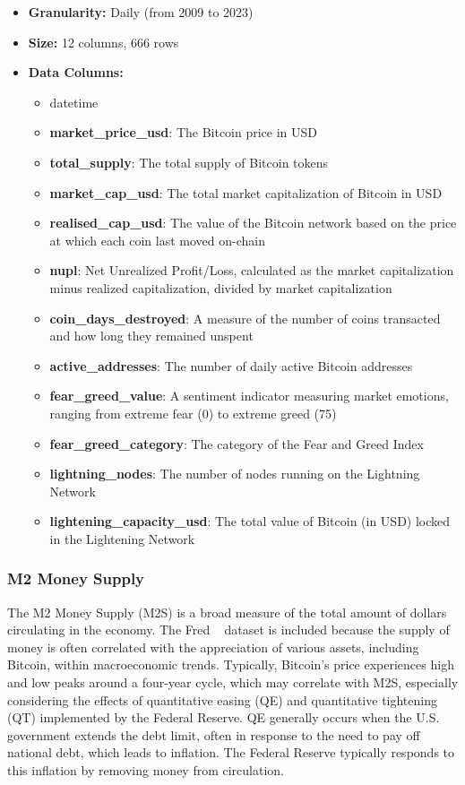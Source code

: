 \begin{itemize}
    \item \textbf{Granularity:} Daily (from 2009 to 2023)
    \item \textbf{Size:} 12 columns, 666 rows
    \item \textbf{Data Columns:}
    \begin{itemize}
        \item datetime
        \item \textbf{market\_price\_usd}: The Bitcoin price in USD
        \item \textbf{total\_supply}: The total supply of Bitcoin tokens
        \item \textbf{market\_cap\_usd}: The total market capitalization of Bitcoin in USD
        \item \textbf{realised\_cap\_usd}: The value of the Bitcoin network based on the price at which each coin last moved on-chain
        \item \textbf{nupl}: Net Unrealized Profit/Loss, calculated as the market capitalization minus realized capitalization, divided by market capitalization
        \item \textbf{coin\_days\_destroyed}: A measure of the number of coins transacted and how long they remained unspent
        \item \textbf{active\_addresses}: The number of daily active Bitcoin addresses
        \item \textbf{fear\_greed\_value}: A sentiment indicator measuring market emotions, ranging from extreme fear (0) to extreme greed (75)
        \item \textbf{fear\_greed\_category}: The category of the Fear and Greed Index
        \item \textbf{lightning\_nodes}: The number of nodes running on the Lightning Network
        \item \textbf{lightening\_capacity\_usd}: The total value of Bitcoin (in USD) locked in the Lightening Network
    \end{itemize}
\end{itemize}

\subsubsection{M2 Money Supply}\label{sec:m2_money_supply}

The M2 Money Supply (M2S) is a broad measure of the total amount of dollars circulating in the economy. The Fred
\ \cite{m2slData} dataset is
included because the supply of money is often correlated with the appreciation of various assets, including Bitcoin,
within macroeconomic trends. Typically, Bitcoin's price experiences high and low peaks around a four-year cycle, which
may correlate with M2S, especially considering the effects of quantitative easing (QE) and quantitative tightening (QT)
implemented by the Federal Reserve. QE generally occurs when the U.S. government extends the debt limit, often in
response to the need to pay off national debt, which leads to inflation. The Federal Reserve typically responds to this
inflation by removing money from circulation.

